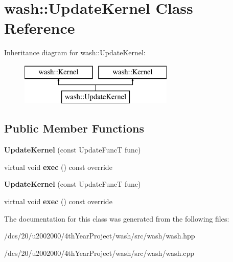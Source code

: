 \hypertarget{classwash_1_1UpdateKernel}{}\section{wash\+:\+:Update\+Kernel Class Reference}
\label{classwash_1_1UpdateKernel}
Inheritance diagram for wash\+:\+:Update\+Kernel\+:\begin{figure}[H]
\begin{center}
\leavevmode
\includegraphics[height=2.000000cm]{classwash_1_1UpdateKernel}
\end{center}
\end{figure}
\subsection*{Public Member Functions}
\begin{DoxyCompactItemize}
\item 
\mbox{\label{classwash_1_1UpdateKernel_a2cd95c4f9bcbceff9df7d094f7d7011f}} 
{\bfseries Update\+Kernel} (const Update\+FuncT func)
\item 
\mbox{\label{classwash_1_1UpdateKernel_a72ec6b0ea453d97708f3fcfd98970366}} 
virtual void {\bfseries exec} () const override
\item 
\mbox{\label{classwash_1_1UpdateKernel_a2cd95c4f9bcbceff9df7d094f7d7011f}} 
{\bfseries Update\+Kernel} (const Update\+FuncT func)
\item 
\mbox{\label{classwash_1_1UpdateKernel_a23c7bb181196e107afb1ca4ce9c79137}} 
virtual void {\bfseries exec} () const override
\end{DoxyCompactItemize}


The documentation for this class was generated from the following files\+:\begin{DoxyCompactItemize}
\item 
/dcs/20/u2002000/4th\+Year\+Project/wash/src/wash/wash.\+hpp\item 
/dcs/20/u2002000/4th\+Year\+Project/wash/src/wash/wash.\+cpp\end{DoxyCompactItemize}
